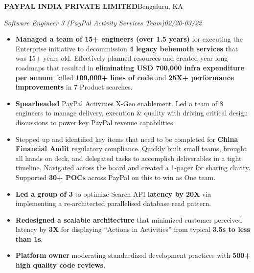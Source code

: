 \documentclass[10pt,letterpaper]{article}
\newlength{\entrygap}      \setlength{\entrygap}{8pt}
\newcommand{\bd}[1]{\textbf{#1}}
\newcommand{\entry}[4]{%
  \par\vspace{\entrygap}%
  \noindent\textbf{#1}\hfill #2\par
  \noindent\textcolor{rolecolor}{\textit{#3}}\hfill\textcolor{rolecolor}{\textit{#4}}\par
  \nopagebreak}
\begin{document}
\entry{PAYPAL INDIA PRIVATE LIMITED}{Bengaluru, KA}
      {Software Engineer 3 (PayPal Activity Services Team)}{02/20-03/22}
\begin{itemize}
\item \bd{Managed a team of 15+ engineers (over 1.5 years)} for executing the Enterprise
  initiative to decommission \bd{4 legacy behemoth services} that was 15+ years old.
  Effectively planned resources and created year long roadmaps that resulted in
  \bd{eliminating USD 700,000 infra expenditure per annum}, killed \bd{100,000+ lines of
  code} and \bd{25X+ performance improvements} in 7 Product searches.
\item \bd{Spearheaded} PayPal Activities X-Geo enablement. Led a team of 8 engineers to
  manage delivery, execution \& quality with driving critical design discussions to power
  key PayPal revenue capabilities.
\item Stepped up and identified key items that need to be completed for \bd{China Financial
  Audit} regulatory compliance. Quickly built small teams, brought all hands on deck, and
  delegated tasks to accomplish deliverables in a tight timeline. Navigated across the
  board and created a 1-pager for sharing clarity. Supported \bd{30+ POCs} across PayPal on
  this to win as One team.
\item \bd{Led a group of 3} to optimize Search API \bd{latency by 20X} via implementing a
  re-architected parallelised database read pattern.
\item \bd{Redesigned a scalable architecture} that minimized customer perceived latency by
  \bd{3X} for displaying ``Actions in Activities'' from typical \bd{3.5s to less than 1s}.
\item \bd{Platform owner} moderating standardized development practices with \bd{500+ high
  quality code reviews}.
\end{itemize}
\end{document}
